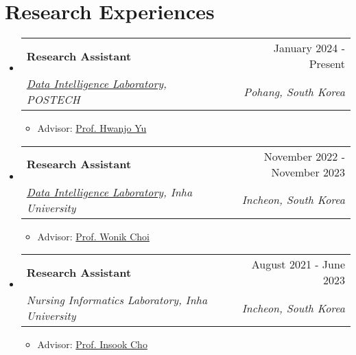 \documentclass[letterpaper,11pt]{article}
\makeatletter
\newcommand{\resumeSubheading}[4]{
  \vspace{-1pt}\item
    \begin{tabular*}{0.97\textwidth}{l@{\extracolsep{\fill}}r}
      #1 & #2 \\
      \textit{\small#3} & \textit{\small #4} \\
    \end{tabular*}\vspace{-5pt}
}
\makeatother
\begin{document}
    \section{Research Experiences}
    \begin{itemize}[leftmargin=*,label=]

        \resumeSubheading
        {\textbf{Research Assistant} }{January 2024 - Present}
            {\href{https://sites.google.com/view/postechdi/home}{Data Intelligence Laboratory}, POSTECH}{Pohang, South Korea}
            \begin{itemize}[label=\bullet]
                \item{Advisor: \href{https://sites.google.com/view/postechdi/member/faculty}{Prof. Hwanjo Yu}}
            \end{itemize}
            
            
        \resumeSubheading
        {\textbf{Research Assistant} }{November 2022 - November 2023}
            {\href{http://dilab.inha.ac.kr/}{Data Intelligence Laboratory}, Inha University}{Incheon, South Korea}
            \begin{itemize}[label=\bullet]
                \item{Advisor: \href{http://bit.ly/3zSrQ8F}{Prof. Wonik Choi}}
            \end{itemize}
            
        \resumeSubheading
        {\textbf{Research Assistant}}{August 2021 - June 2023}
            {Nursing Informatics Laboratory, Inha University}{Incheon, South Korea}
            \begin{itemize}[label=\bullet]
                \item{Advisor: \href{http://bit.ly/412nYOw}{Prof. Insook Cho}}
            \end{itemize}
            
    \end{itemize}

        
\end{document}
